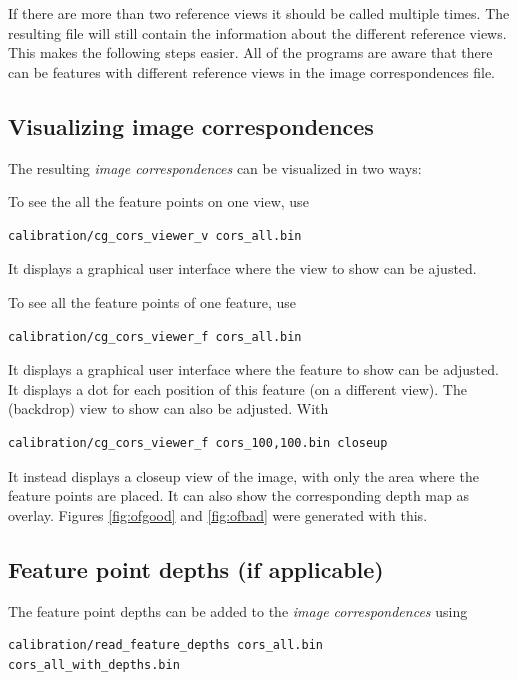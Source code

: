 \documentclass{scrreprt}
\begin{document}
\noindent If there are more than two reference views it should be called multiple times. The resulting file will still contain the information about the different reference views. This makes the following steps easier. All of the programs are aware that there can be features with different reference views in the image correspondences file.


\subsection{Visualizing image correspondences}
The resulting \emph{image correspondences} can be visualized in two ways:

To see the all the feature points on one view, use
\begin{lstlisting}[language=bash]
calibration/cg_cors_viewer_v cors_all.bin
\end{lstlisting}
It displays a graphical user interface where the view to show can be ajusted.

To see all the feature points of one feature, use
\begin{lstlisting}[language=bash]
calibration/cg_cors_viewer_f cors_all.bin 
\end{lstlisting}

\noindent It displays a graphical user interface where the feature to show can be adjusted. It displays a dot for each position of this feature (on a different view). The (backdrop) view to show can also be adjusted. With
\begin{lstlisting}[language=bash]
calibration/cg_cors_viewer_f cors_100,100.bin closeup
\end{lstlisting}

\noindent It instead displays a closeup view of the image, with only the area where the feature points are placed. It can also show the corresponding depth map as overlay. Figures \ref{fig:ofgood} and \ref{fig:ofbad} were generated with this.



\subsection{Feature point depths (if applicable)}
The feature point depths can be added to the \emph{image correspondences} using
\begin{lstlisting}[language=bash]
calibration/read_feature_depths cors_all.bin
cors_all_with_depths.bin
\end{lstlisting}
\end{document}
